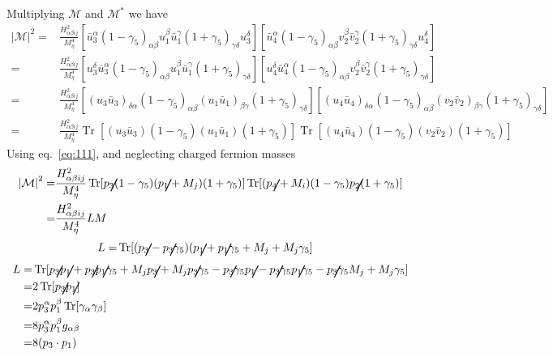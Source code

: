 Multiplying $\mathcal{M}$ and $\mathcal{M}^*$ we have
\begin{align}
\left|\mathcal{M}\right|^2=&\frac{H_{\alpha \beta i j}^2}{M_\eta^4}
[\bar{u}_3^\alpha(1-\gamma_5)_{\alpha\beta}u_1^\beta\bar{u}_1^\gamma(1+\gamma_5)_{\gamma\delta}u_3^\delta]
[\bar{u}_4^\alpha(1-\gamma_5)_{\alpha\beta}v_2^\beta\bar{v}_2^\gamma(1+\gamma_5)_{\gamma\delta}u_4^\delta]\nonumber\\
  =&\frac{H_{\alpha\beta i j}^2}{M_\eta^4}
[u_3^\delta\bar{u}_3^\alpha(1-\gamma_5)_{\alpha\beta}u_1^\beta\bar{u}_1^\gamma(1+\gamma_5)_{\gamma\delta}]
[u_4^\delta\bar{u}_4^\alpha(1-\gamma_5)_{\alpha\beta}v_2^\beta\bar{v}_2^\gamma(1+\gamma_5)_{\gamma\delta}]\nonumber\\
  =&\frac{H_{\alpha\beta i j}^2}{M_\eta^4}
[(u_3\bar{u}_3)_{\delta\alpha}(1-\gamma_5)_{\alpha\beta}(u_1\bar{u}_1)_{\beta\gamma}(1+\gamma_5)_{\gamma\delta}]
[(u_4\bar{u}_4)_{\delta\alpha}(1-\gamma_5)_{\alpha\beta}(v_2\bar{v}_2)_{\beta\gamma}(1+\gamma_5)_{\gamma\delta}]\nonumber\\
=&\frac{H_{\alpha\beta i j}^2}{M_\eta^4}
\operatorname{Tr}[(u_3\bar{u}_3)(1-\gamma_5)(u_1\bar{u}_1)(1+\gamma_5)]
\operatorname{Tr}[(u_4\bar{u}_4)(1-\gamma_5)(v_2\bar{v}_2)(1+\gamma_5)]
\end{align}
Using eq.~\eqref{eq:111}, and neglecting charged fermion masses
\begin{align}
\left|\mathcal{M}\right|^2=&\frac{H_{\alpha\beta i j}^2}{M_\eta^4}
\operatorname{Tr}[\cancel{p}_3(1-\gamma_5)(\cancel{p}_1+M_j)(1+\gamma_5)]
\operatorname{Tr}[(\cancel{p}_4+M_i)(1-\gamma_5)\cancel{p}_2(1+\gamma_5)]\nonumber\\
=&\frac{H_{\alpha\beta i j}^2}{M_\eta^4} L M
\end{align}
\begin{align}
  L=&\operatorname{Tr}[(\cancel{p}_3-\cancel{p}_3\gamma_5)(\cancel{p}_1+\cancel{p}_1\gamma_5+M_j+M_j\gamma_5]
\end{align}
\begin{align}
  L=&\operatorname{Tr}[\cancel{p}_3\cancel{p}_1+\cancel{p}_3\cancel{p}_1\gamma_5+M_j\cancel{p}_3+M_j\cancel{p}_3\gamma_5-\cancel{p}_3\gamma_5\cancel{p}_1-\cancel{p}_3\gamma_5\cancel{p}_1\gamma_5-\cancel{p}_3\gamma_5M_j+M_j\gamma_5]\nonumber\\
  =&2\operatorname{Tr}[\cancel{p}_3\cancel{p}_1]\nonumber\\
  =&2p_3^\alpha p_1^\beta\operatorname{Tr}[\gamma_\alpha\gamma_\beta]\nonumber\\
  =&8p_3^\alpha p_1^\beta g_{\alpha\beta}\nonumber\\
  =&8(p_3\cdot p_1)
\end{align}
